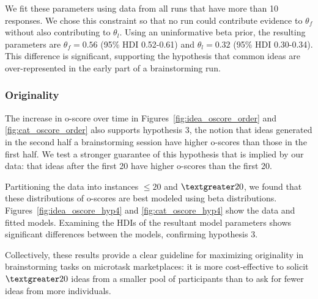 We fit these parameters using data from all runs that have more than 10 responses. We chose this constraint so that no run could contribute evidence to $\theta_f$ without also contributing to $\theta_l$. Using an uninformative beta prior, the resulting parameters are $\theta_f = 0.56$ (95\% HDI 0.52-0.61) and $\theta_l = 0.32$ (95\% HDI 0.30-0.34). This difference is significant, supporting the hypothesis that common ideas are over-represented in the early part of a brainstorming run.



\subsubsection{Originality}

The increase in o-score over time in Figures~\ref{fig:idea_oscore_order} and \ref{fig:cat_oscore_order} also supports hypothesis 3, the notion that ideas generated in the second half a brainstorming session have higher o-scores than those in the first half. We test a stronger guarantee of this hypothesis that is implied by our data: that ideas after the first 20 have higher o-scores than the first 20.

Partitioning the data into instances $\leq20$ and $\textgreater20$, we found that these distributions of o-scores are best modeled using beta distributions. Figures~\ref{fig:idea_oscore_hyp4} and \ref{fig:cat_oscore_hyp4} show the data and fitted models. Examining the HDIs of the resultant model parameters shows significant differences between the models, confirming hypothesis 3.

Collectively, these results provide a clear guideline for maximizing originality in brainstorming tasks on microtask marketplaces: it is more cost-effective to solicit $\textgreater20$ ideas from a smaller pool of participants than to ask for fewer ideas from more individuals.




